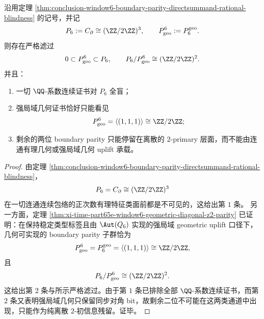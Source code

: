 \begin{theorem}\label{thm:conclusion-window6-boundary-parity-three-layer-blind-filtration}
沿用定理 \ref{thm:conclusion-window6-boundary-parity-directsummand-rational-blindness} 的记号，并记
\[
P_6:=C_{\partial}\cong (\ZZ/2\ZZ)^3,
\qquad
P_{\mathrm{geo}}^6:=P_6^{\mathrm{geo}}.
\]
则存在严格滤过
\[
0\subset P_{\mathrm{geo}}^6\subset P_6,
\qquad
P_6/P_{\mathrm{geo}}^6\cong (\ZZ/2\ZZ)^2.
\]
并且：
\begin{enumerate}
\normalfont
  \item 一切 \(\QQ\)-系数连续证书对 \(P_6\) 全盲；
  \item 强局域几何证书恰好只能看见
  \[
  P_{\mathrm{geo}}^6=\langle(1,1,1)\rangle\cong \ZZ/2\ZZ;
  \]
  \item 剩余的两位 boundary parity 只能停留在离散的 \(2\)-primary 层面，而不能由连通有理几何或强局域几何 uplift 承载。
\end{enumerate}
\end{theorem}
\begin{proof}
由定理 \ref{thm:conclusion-window6-boundary-parity-directsummand-rational-blindness}，
\[
P_6=C_{\partial}\cong (\ZZ/2\ZZ)^3
\]
在一切连通连续包络的正次数有理特征类面前都是不可见的，这给出第 \(1\) 条。
另一方面，定理 \ref{thm:xi-time-part65e-window6-geometric-diagonal-z2-parity} 已证明：在保持稳定类型标签且由 \(\Aut(Q_6)\) 实现的强局域 geometric uplift 口径下，几何可实现的 boundary parity 子群恰为
\[
P_{\mathrm{geo}}^6=P_6^{\mathrm{geo}}=\langle(1,1,1)\rangle\cong \ZZ/2\ZZ,
\]
且
\[
P_6/P_{\mathrm{geo}}^6\cong (\ZZ/2\ZZ)^2.
\]
这给出第 \(2\) 条与所示严格滤过。由于第 \(1\) 条已排除全部 \(\QQ\)-系数连续证书，而第 \(2\) 条又表明强局域几何只保留同步对角 bit，故剩余二位不可能在这两类通道中出现，只能作为纯离散 \(2\)-初信息残留。证毕。
\end{proof}

